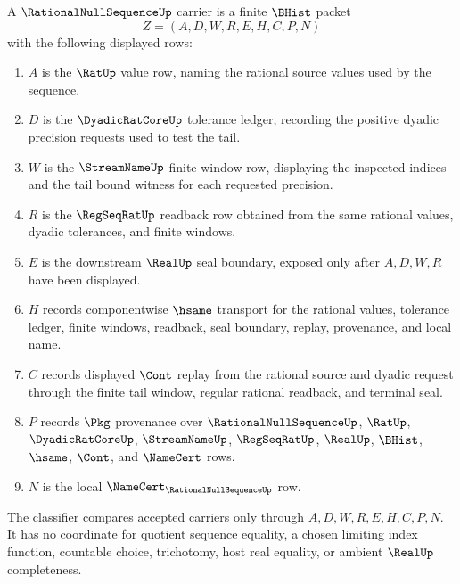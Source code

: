 \begin{definition}
\label{def:rational-null-sequence-carrier}
A $\RationalNullSequenceUp$ carrier is a finite $\BHist$ packet
$$
Z=(A,D,W,R,E,H,C,P,N)
$$
with the following displayed rows:
\begin{enumerate}
\item $A$ is the $\RatUp$ value row, naming the rational source values used by the sequence.
\item $D$ is the $\DyadicRatCoreUp$ tolerance ledger, recording the positive dyadic precision requests used to test the tail.
\item $W$ is the $\StreamNameUp$ finite-window row, displaying the inspected indices and the tail bound witness for each requested precision.
\item $R$ is the $\RegSeqRatUp$ readback row obtained from the same rational values, dyadic tolerances, and finite windows.
\item $E$ is the downstream $\RealUp$ seal boundary, exposed only after $A,D,W,R$ have been displayed.
\item $H$ records componentwise $\hsame$ transport for the rational values, tolerance ledger, finite windows, readback, seal boundary, replay, provenance, and local name.
\item $C$ records displayed $\Cont$ replay from the rational source and dyadic request through the finite tail window, regular rational readback, and terminal seal.
\item $P$ records $\Pkg$ provenance over $\RationalNullSequenceUp$, $\RatUp$, $\DyadicRatCoreUp$, $\StreamNameUp$, $\RegSeqRatUp$, $\RealUp$, $\BHist$, $\hsame$, $\Cont$, and $\NameCert$ rows.
\item $N$ is the local $\NameCert_{\RationalNullSequenceUp}$ row.
\end{enumerate}
The classifier compares accepted carriers only through $A,D,W,R,E,H,C,P,N$. It has no coordinate for quotient sequence equality, a chosen limiting index function, countable choice, trichotomy, host real equality, or ambient $\RealUp$ completeness.
\end{definition}

